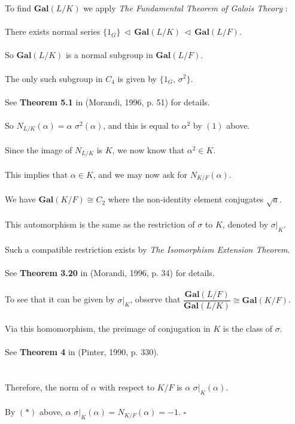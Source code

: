 \documentclass{article}
\begin{document}
To find $\textbf{Gal}(L/K)$ we apply \emph{The Fundamental Theorem of Galois Theory} : \\\\
\indent There exists normal series $\{1_G\} \, \triangleleft \, \textbf{Gal}(L/K) \, \triangleleft \, \textbf{Gal}(L/F)$. \\\\
\indent So $\textbf{Gal}(L/K)$ is a normal subgroup in $\textbf{Gal}(L/F)$. \\\\
\indent The only such subgroup in $C_4$ is given by $\{1_G, \, \sigma^2\}$. \\\\
\indent See \textbf{Theorem 5.1} in (Morandi, 1996, p. 51) for details. \\\\
So $N_{L/K}(\alpha) = \alpha \,\, \sigma^2(\alpha)$, and this is equal to $\alpha^2$ by $(1)$ above. \\\\
Since the image of $N_{L/K}$ is $K$, we now know that $\alpha^2 \in K$. \\\\
This implies that $\alpha \in K$, and we may now ask for $N_{K/F}(\alpha)$. \\\\
We have $\textbf{Gal}(K/F) \cong C_2$ where the non-identity element conjugates $\sqrt{a}$. \\\\
This automorphism is the same as the restriction of $\sigma$ to $K$, denoted by $\sigma|_K$. \\\\
\indent Such a compatible restriction exists by \emph{The Isomorphism Extension Theorem}. \\\\
\indent See \textbf{Theorem 3.20} in (Morandi, 1996, p. 34) for details. \\\\
\indent To see that it can be given by $\sigma|_K$, observe that $\dfrac{\textbf{Gal}(L/F)}{\textbf{Gal}(L/K)} \cong \textbf{Gal}(K/F)$. \\\\
\indent Via this homomorphism, the preimage of conjugation in $K$ is the class of $\sigma$. \\\\
\indent  See \textbf{Theorem 4} in (Pinter, 1990, p. 330). \\\\\\
Therefore, the norm of $\alpha$ with respect to $K/F$ is $\alpha \,\, \sigma|_K(\alpha)$. \\\\
By $(\ast)$ above, $\alpha \,\, \sigma|_K(\alpha) = N_{K/F}(\alpha) = -1$. $\square$ \\\\\\
\end{document}
